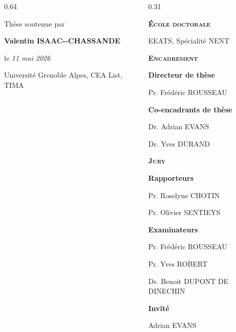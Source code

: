 {\begin{frame}[plain]
\begin{columns}
\begin{column}{0.64\linewidth}
            \bigskip

            \normalsize
            Thèse soutenue par

            \Large
            \textbf{Valentin ISAAC-{-}CHASSANDE}

            \bigskip

            \normalsize
            le
            \large
            \textit{11 mai 2026}

            \bigskip

            \normalsize
            Université Grenoble Alpes, CEA List, TIMA
        \end{column}

        \begin{column}{0.31\linewidth}
            \footnotesize\raggedleft

            \textbf{\textsc{\'Ecole doctorale}} \quad{}

            \medskip
            EEATS, Spécialité NENT

            \bigskip
            \textbf{\textsc{Encadrement}} \quad{}

            \medskip
            \textbf{Directeur de thèse}

            Pr. Frédéric ROUSSEAU

            \smallskip
            \textbf{Co-encadrants de thèse}

            Dr. Adrian EVANS

            Dr. Yves DURAND

            \bigskip
            \textbf{\textsc{Jury}} \quad{}

            \medskip
            \textbf{Rapporteurs}

            Pr. Roselyne CHOTIN

            Pr. Olivier SENTIEYS

            \smallskip
            \textbf{Examinateurs}

            Pr. Frédéric ROUSSEAU

            Pr. Yves ROBERT

            Dr. Benoit DUPONT DE DINECHIN

            \smallskip
            \textbf{Invité}

            Adrian EVANS

        \end{column}
    \end{columns}
\end{frame}

}